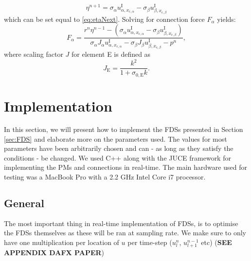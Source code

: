 \documentclass{article}
\begin{document}
\begin{equation}
    \eta^{n+1} = \sigma_\alpha u_{\alpha,x_{\text{c},\alpha}}^\text{I} - \sigma_\beta u_{\beta,x_{\text{c},\beta}}^\text{I}
\end{equation}
which can be set equal to \eqref{eq:etaNext}. Solving for connection force $F_\alpha$ yields:
\begin{equation}
    F_\alpha = \frac{r^n\eta^{n-1}-(\sigma_\alpha u_{\alpha, x_{\text{c},\alpha}}^\text{I} - \sigma_\beta u_{\beta,x_{\text{c},\beta}}^\text{I})}{\sigma_\alpha J_\alpha u_{\alpha, x_{\text{c},\alpha}}^\text{I} - \sigma_\beta J_\beta u_{\beta,x_{\text{c},\beta}}^\text{I}-p^n},
\end{equation}
where scaling factor $J$ for element E is defined as
\begin{equation}
    J_\text{E} = \frac{k^2}{1+\sigma_{0,\text{E}}k}.
\end{equation}
\section{Implementation}\label{sec:implementation}
In this section, we will present how to implement the FDSs presented in Section \ref{sec:FDS} and elaborate more on the parameters used. The values for most parameters have been arbitrarily chosen and can - as long as they satisfy the conditions - be changed. We used C++ along with the JUCE framework for implementing the PMs and connections in real-time. The main hardware used for testing was a MacBook Pro with a 2.2 GHz Intel Core i7 processor.

\subsection{General}
The most important thing in real-time implementation of FDSs, is to optimise the FDSs themselves as these will be ran at sampling rate. We make sure to only have one multiplication per location of $u$ per time-step ($u_l^n$, $u_{l+1}^{n-1}$ etc) (\textbf{SEE APPENDIX DAFX PAPER}) %
\end{document}
